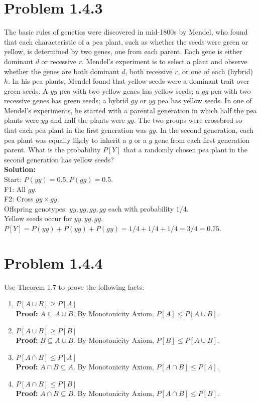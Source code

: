 \documentclass{article}
\begin{document}
\section*{Problem 1.4.3}
The basic rules of genetics were discovered in mid-1800s by Mendel, who found that each characteristic of a pea plant, such as whether the seeds were green or yellow, is determined by two genes, one from each parent. Each gene is either dominant $d$ or recessive $r$. Mendel's experiment is to select a plant and observe whether the genes are both dominant $d$, both recessive $r$, or one of each (hybrid) $h$. In his pea plants, Mendel found that yellow seeds were a dominant trait over green seeds. A $yy$ pea with two yellow genes has yellow seeds; a $gg$ pea with two recessive genes has green seeds; a hybrid $gy$ or $yg$ pea has yellow seeds. In one of Mendel's experiments, he started with a parental generation in which half the pea plants were $yy$ and half the plants were $gg$. The two groups were crossbred so that each pea plant in the first generation was $gy$. In the second generation, each pea plant was equally likely to inherit a $y$ or a $g$ gene from each first generation parent. What is the probability $P[Y]$ that a randomly chosen pea plant in the second generation has yellow seeds? \\
\textbf{Solution:} \\
Start: $P(yy)=0.5, P(gg)=0.5$. \\
F1: All $gy$. \\
F2: Cross $gy \times gy$. \\
Offspring genotypes: $yy, yg, gy, gg$ each with probability $1/4$. \\
Yellow seeds occur for $yy, yg, gy$. \\
$P[Y] = P(yy) + P(yg) + P(gy) = 1/4 + 1/4 + 1/4 = 3/4 = 0.75$.

\newpage

\section*{Problem 1.4.4}
Use Theorem 1.7 to prove the following facts:
\begin{enumerate}[label=(\alph*)]
    \item $P[A \cup B] \ge P[A]$ \\
    \textbf{Proof:} $A \subseteq A \cup B$. By Monotonicity Axiom, $P[A] \le P[A \cup B]$.
    \item $P[A \cup B] \ge P[B]$ \\
    \textbf{Proof:} $B \subseteq A \cup B$. By Monotonicity Axiom, $P[B] \le P[A \cup B]$.
    \item $P[A \cap B] \le P[A]$ \\
    \textbf{Proof:} $A \cap B \subseteq A$. By Monotonicity Axiom, $P[A \cap B] \le P[A]$.
    \item $P[A \cap B] \le P[B]$ \\
    \textbf{Proof:} $A \cap B \subseteq B$. By Monotonicity Axiom, $P[A \cap B] \le P[B]$.
\end{enumerate}
\end{document}

